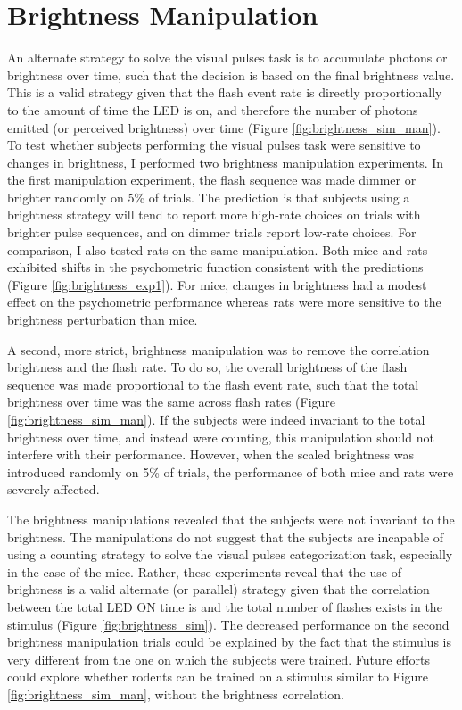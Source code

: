 \section{Brightness Manipulation}
An alternate strategy to solve the visual pulses task is to accumulate photons or brightness over time, such that the decision is based on the final brightness value. This is a valid strategy given that the flash event rate is directly proportionally to the amount of time the LED is on, and therefore the number of photons emitted (or perceived brightness) over time (Figure \ref{fig:brightness_sim_man}). To test whether subjects performing the visual pulses task were sensitive to changes in brightness, I performed two brightness manipulation experiments. In the first manipulation experiment, the flash sequence was made dimmer or brighter randomly on 5\% of trials. The prediction is that subjects using a brightness strategy will tend to report more high-rate choices on trials with brighter pulse sequences, and on dimmer trials report low-rate choices. For comparison, I also tested rats on the same manipulation. Both mice and rats exhibited shifts in the psychometric function consistent with the predictions (Figure \ref{fig:brightness_exp1}). For mice, changes in brightness had a modest effect on the psychometric performance whereas rats were more sensitive to the  brightness perturbation than mice. \par 
A second, more strict, brightness manipulation was to remove the correlation brightness and the flash rate. To do so, the overall brightness of the flash sequence was made proportional to the flash event rate, such that the total brightness over time was the same across flash rates  (Figure \ref{fig:brightness_sim_man}). If the subjects were indeed invariant to the total brightness over time, and instead were counting, this manipulation should not interfere with their performance. However, when the scaled brightness was introduced randomly on 5\% of trials, the performance of both mice and rats were severely affected. \par 
The brightness manipulations revealed that the subjects were not invariant to the brightness. The manipulations do not suggest that the subjects are incapable of using a counting strategy to solve the visual pulses categorization task, especially in the case of the mice. Rather, these experiments reveal that the use of brightness is a valid alternate (or parallel) strategy given that the correlation between the total LED ON time is and the total number of flashes exists in the stimulus (Figure \ref{fig:brightness_sim}). The decreased performance on the second brightness manipulation trials could be explained by the fact that the stimulus is very different from the one on which the subjects were trained. Future efforts could explore whether rodents can be trained on a stimulus similar to Figure \ref{fig:brightness_sim_man}, without the brightness correlation. 

